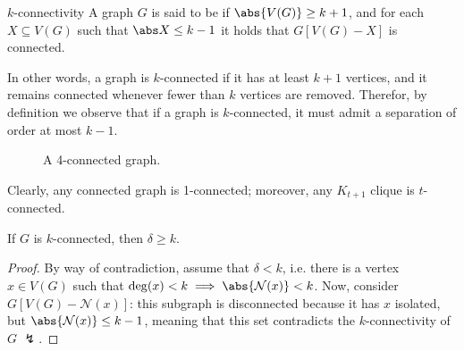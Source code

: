 \documentclass[a4paper, 12pt]{report}
\begin{document}
    \begin{frameddefn}{$k$-connectivity}
        A graph $G$ is said to be  if $\abs{V(G)} \ge k + 1$, and for each $X \subseteq V(G)$ such that $\abs X \le k - 1$ it holds that $G[V(G) - X]$ is connected.
    \end{frameddefn}

    In other words, a graph is $k$-connected if it has at least $k + 1$ vertices, and it remains connected whenever fewer than $k$ vertices are removed. Therefor, by definition we observe that if a graph is  $k$-connected, it must admit a separation of order at most $k - 1$.

    \begin{figure}[H]
        \centering
        \caption{A 4-connected graph.}
    \end{figure}

    Clearly, any connected graph is 1-connected; moreover, any $K_{t +1}$ clique is $t$-connected.

    \begin{framedprop}[label={kconn}]{}
        If $G$ is $k$-connected, then $\delta \ge k$.
    \end{framedprop}

    \begin{proof}
        By way of contradiction, assume that $\delta < k$, i.e. there is a vertex $x \in V(G)$ such that $\deg(x) < k \implies \abs{\mathcal N(x)} < k$. Now, consider $G[V(G) - \mathcal N (x)]$: this subgraph is disconnected because it has $x$ isolated, but $\abs{\mathcal N(x)} \le k - 1$, meaning that this set contradicts the $k$-connectivity of $G$ $\lightning$.
    \end{proof}
\end{document}
